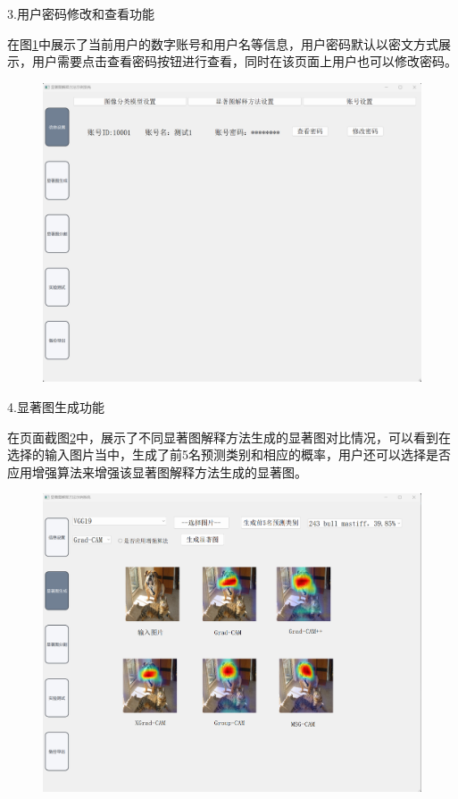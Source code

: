 3.用户密码修改和查看功能

在图\ref{fig:f3}中展示了当前用户的数字账号和用户名等信息，用户密码默认以密文方式展示，用户需要点击查看密码按钮进行查看，同时在该页面上用户也可以修改密码。

\begin{figure}[h]
	\centering 
	\includegraphics[width=12cm]{fig/ch5/f3.png}
	\label{fig:f3}
\end{figure}

4.显著图生成功能

在页面截图\ref{fig:f4}中，展示了不同显著图解释方法生成的显著图对比情况，可以看到在选择的输入图片当中，生成了前5名预测类别和相应的概率，用户还可以选择是否应用增强算法来增强该显著图解释方法生成的显著图。

\begin{figure}[h]
	\centering 
	\includegraphics[width=12cm]{fig/ch5/f4.png}
	\label{fig:f4}
\end{figure}

